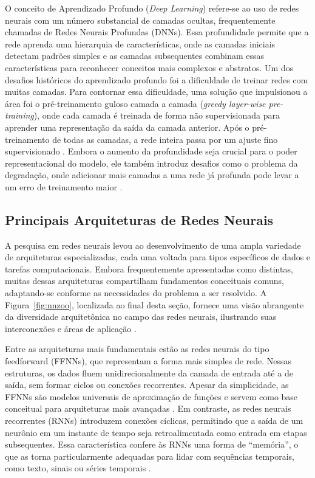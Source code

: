 O conceito de Aprendizado Profundo (\textit{Deep Learning}) refere-se ao uso de redes neurais com um número substancial de camadas ocultas, frequentemente chamadas de Redes Neurais Profundas (DNNs). Essa profundidade permite que a rede aprenda uma hierarquia de características, onde as camadas iniciais detectam padrões simples e as camadas subsequentes combinam essas características para reconhecer conceitos mais complexos e abstratos. Um dos desafios históricos do aprendizado profundo foi a dificuldade de treinar redes com muitas camadas. Para contornar essa dificuldade, uma solução que impulsionou a área foi o pré-treinamento guloso camada a camada (\textit{greedy layer-wise pre-training}), onde cada camada é treinada de forma não supervisionada para aprender uma representação da saída da camada anterior. Após o pré-treinamento de todas as camadas, a rede inteira passa por um ajuste fino supervisionado . Embora o aumento da profundidade seja crucial para o poder representacional do modelo, ele também introduz desafios como o problema da degradação, onde adicionar mais camadas a uma rede já profunda pode levar a um erro de treinamento maior .

\subsection{Principais Arquiteturas de Redes Neurais}

 A pesquisa em redes neurais levou ao desenvolvimento de uma ampla variedade de arquiteturas especializadas, cada uma voltada para tipos específicos de dados e tarefas computacionais. Embora frequentemente apresentadas como distintas, muitas dessas arquiteturas compartilham fundamentos conceituais comuns, adaptando-se conforme as necessidades do problema a ser resolvido. A Figura~\ref{fig:nnzoo}, localizada ao final desta seção,  fornece uma visão abrangente da diversidade arquitetônica no campo das redes neurais, ilustrando suas interconexões e áreas de aplicação .


Entre as arquiteturas mais fundamentais estão as redes neurais do tipo feedforward (FFNNs), que representam a forma mais simples de rede. Nessas estruturas, os dados fluem unidirecionalmente da camada de entrada até a de saída, sem formar ciclos ou conexões recorrentes. Apesar da simplicidade, as FFNNs são modelos universais de aproximação de funções e servem como base conceitual para arquiteturas mais avançadas . Em contraste, as redes neurais recorrentes (RNNs) introduzem conexões cíclicas, permitindo que a saída de um neurônio em um instante de tempo seja retroalimentada como entrada em etapas subsequentes. Essa característica confere às RNNs uma forma de “memória”, o que as torna particularmente adequadas para lidar com sequências temporais, como texto, sinais ou séries temporais .


